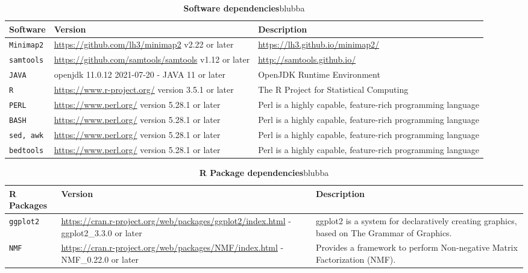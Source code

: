 \documentclass[times, 11pt, a4paper]{article}
\begin{document}
\begin{table}[]
\begin{tabular}{|p{1.5cm}|p{7cm}|p{6.5cm}|}
\hline 
            Software & Version & Description \\ 
            \hline \hline
            \texttt{Minimap2} & \url{https://github.com/lh3/minimap2} v2.22 or later & \url{https://lh3.github.io/minimap2/} \\ \hline
            \texttt{samtools} & \url{https://github.com/samtools/samtools} v1.12 or later & \url{http://samtools.github.io/} \\ \hline
	   \texttt{JAVA} & openjdk 11.0.12 2021-07-20 - JAVA 11 or later & OpenJDK Runtime Environment\\ \hline
	   \texttt{R} &  \url{https://www.r-project.org/} version 3.5.1 or later & The R Project for Statistical Computing \\ \hline
	   \texttt{PERL} &  \url{https://www.perl.org/} version 5.28.1 or later & Perl is a highly capable, feature-rich programming language \\ \hline
	   \texttt{BASH} &  \url{https://www.perl.org/} version 5.28.1 or later & Perl is a highly capable, feature-rich programming language \\ \hline
	   \texttt{sed, awk} &  \url{https://www.perl.org/} version 5.28.1 or later & Perl is a highly capable, feature-rich programming language \\ \hline	   
	   \texttt{bedtools} &  \url{https://www.perl.org/} version 5.28.1 or later & Perl is a highly capable, feature-rich programming language \\ \hline	   
\end{tabular}
\caption{\textbf{Software dependencies}\label{tab:software} blubba}
\end{table}

\begin{table}[]
\begin{tabular}{|p{1.5cm}|p{7cm}|p{6.5cm}|}
\hline 
            R Packages & Version & Description \\ 
            \hline \hline
            \texttt{ggplot2} & \url{https://cran.r-project.org/web/packages/ggplot2/index.html} - ggplot2\_3.3.0 or later &  ggplot2 is a system for declaratively creating graphics, based on The Grammar of Graphics. \\ \hline
            \texttt{NMF} & \url{https://cran.r-project.org/web/packages/NMF/index.html} - NMF\_0.22.0 or later &  Provides a framework to perform Non-negative Matrix Factorization (NMF). \\ \hline
\end{tabular}
\caption{\textbf{R Package dependencies}\label{tab:software} blubba}
\end{table}
\end{document}
